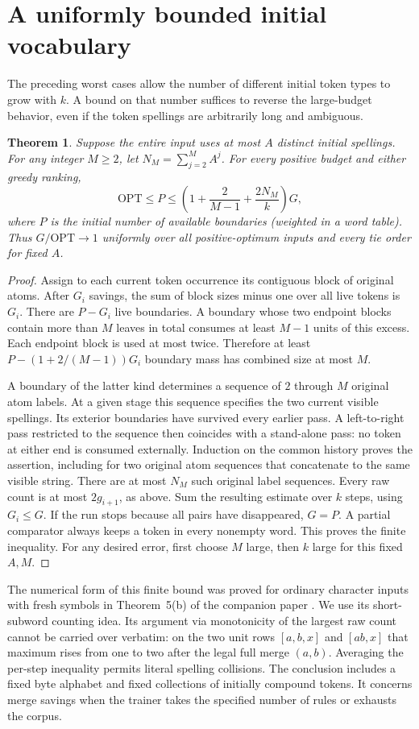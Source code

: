 \documentclass[11pt]{article}
\newtheorem{theorem}{Theorem}
\newcommand{\OPT}{\mathrm{OPT}}
\begin{document}
\section{A uniformly bounded initial vocabulary}
The preceding worst cases allow the number of different initial token types to grow with $k$. A bound on that number suffices to reverse the large-budget behavior, even if the token spellings are arbitrarily long and ambiguous.
\begin{theorem}\label{th:fixed}
Suppose the entire input uses at most $A$ distinct initial spellings. For any integer $M\ge2$, let $N_M=\sum_{j=2}^M A^j$. For every positive budget and either greedy ranking,
\[
 \OPT\le P\le \left(1+\frac{2}{M-1}+\frac{2N_M}{k}\right)G ,
\]
where $P$ is the initial number of available boundaries (weighted in a word table). Thus $G/\OPT\to1$ uniformly over all positive-optimum inputs and every tie order for fixed $A$.
\end{theorem}
\begin{proof}
Assign to each current token occurrence its contiguous block of original atoms. After $G_i$ savings, the sum of block sizes minus one over all live tokens is $G_i$. There are $P-G_i$ live boundaries. A boundary whose two endpoint blocks contain more than $M$ leaves in total consumes at least $M-1$ units of this excess. Each endpoint block is used at most twice. Therefore at least $P-(1+2/(M-1))G_i$ boundary mass has combined size at most $M$.

A boundary of the latter kind determines a sequence of $2$ through $M$ original atom labels. At a given stage this sequence specifies the two current visible spellings. Its exterior boundaries have survived every earlier pass. A left-to-right pass restricted to the sequence then coincides with a stand-alone pass: no token at either end is consumed externally. Induction on the common history proves the assertion, including for two original atom sequences that concatenate to the same visible string. There are at most $N_M$ such original label sequences. Every raw count is at most $2g_{i+1}$, as above. Sum the resulting estimate over $k$ steps, using $G_i\le G$. If the run stops because all pairs have disappeared, $G=P$. A partial comparator always keeps a token in every nonempty word. This proves the finite inequality. For any desired error, first choose $M$ large, then $k$ large for this fixed $A,M$.
\end{proof}
The numerical form of this finite bound was proved for ordinary character inputs with fresh symbols in Theorem~5(b) of the companion paper \cite{fixed}. We use its short-subword counting idea. Its argument via monotonicity of the largest raw count cannot be carried over verbatim: on the two unit rows $[a,b,x]$ and $[ab,x]$ that maximum rises from one to two after the legal full merge $(a,b)$. Averaging the per-step inequality permits literal spelling collisions. The conclusion includes a fixed byte alphabet and fixed collections of initially compound tokens. It concerns merge savings when the trainer takes the specified number of rules or exhausts the corpus.
\end{document}
